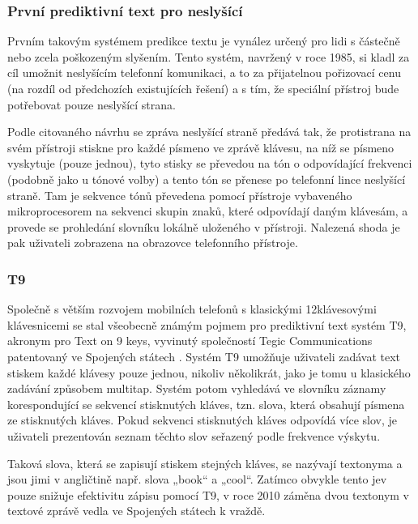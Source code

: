 \documentclass[a4paper,11pt]{article}
\begin{document}
\subsubsection{První prediktivní text pro neslyšící}

Prvním takovým systémem predikce textu je vynález určený pro lidi s částečně nebo zcela poškozeným slyšením. Tento systém, navržený v roce 1985, si kladl za cíl umožnit neslyšícím telefonní komunikaci, a to za přijatelnou pořizovací cenu (na rozdíl od předchozích existujících řešení) a s tím, že speciální přístroj bude potřebovat pouze neslyšící strana. \cite{Feinson1988}

Podle citovaného návrhu se zpráva neslyšící straně předává tak, že protistrana na svém přístroji stiskne pro každé písmeno ve zprávě klávesu, na níž se písmeno vyskytuje (pouze jednou), tyto stisky se převedou na tón o odpovídající frekvenci (podobně jako u tónové volby) a tento tón se přenese po telefonní lince neslyšící straně. Tam je sekvence tónů převedena pomocí přístroje vybaveného mikroprocesorem na sekvenci skupin znaků, které odpovídají daným klávesám, a provede se prohledání slovníku lokálně uloženého v přístroji. Nalezená shoda je pak uživateli zobrazena na obrazovce telefonního přístroje.

\subsubsection{T9}\label{t9}

Společně s větším rozvojem mobilních telefonů s klasickými 12klávesovými klávesnicemi se stal všeobecně známým pojmem pro prediktivní text systém T9, akronym pro Text on 9 keys, vyvinutý společností Tegic Communications \cite{Edq6tEyjOSzk54RQ} patentovaný ve Spojených státech \cite{Grover1998}. Systém T9 umožňuje uživateli zadávat text stiskem každé klávesy pouze jednou, nikoliv několikrát, jako je tomu u klasického zadávání způsobem multitap. Systém potom vyhledává ve slovníku záznamy korespondující se sekvencí stisknutých kláves, tzn. slova, která obsahují písmena ze stisknutých kláves. Pokud sekvenci stisknutých kláves odpovídá více slov, je uživateli prezentován seznam těchto slov seřazený podle frekvence výskytu. %

Taková slova, která se zapisují stiskem stejných kláves, se nazývají textonyma \cite{ZORN2007} a jsou jimi v angličtině např. slova „book“ a „cool“. Zatímco obvykle tento jev pouze snižuje efektivitu zápisu pomocí T9, v roce 2010 záměna dvou textonym v textové zprávě vedla ve Spojených státech k vraždě. \cite{bjjL0GPb5QxyO1A8} 
\end{document}
